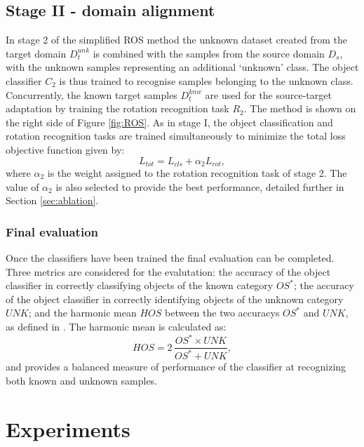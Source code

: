 \documentclass[10pt,twocolumn,letterpaper]{article}
\begin{document}
\subsection{Stage II - domain alignment}
\label{sec:stage2}

In stage 2 of the simplified ROS method the unknown dataset created from the target domain $D_t^{unk}$ is combined with the samples from the source domain $D_s$, with the unknown samples representing an additional `unknown' class. The object classifier $C_2$ is thus trained to recognise samples belonging to the unknown class. Concurrently, the known target samples  $D^{knw}_t$ are used for the source-target adaptation by training the rotation recognition task $R_2$. The method is shown on the right side of Figure \ref{fig:ROS}. As in stage I, the object classification and rotation recognition tasks are trained simultaneously to minimize the total loss objective function given by:
\begin{equation}
  L_{tot} = L_{cls} + \alpha_2 L_{rot} ,
  \label{eq:totalloss}
\end{equation}
where $\alpha_2$ is the weight assigned to the rotation recognition task of stage 2. The value of $\alpha_2$ is also selected to provide the best performance, detailed further in Section \ref{sec:ablation}. 


\subsubsection*{Final evaluation}

Once the classifiers have been trained the final evaluation can be completed. Three metrics are considered for the evalutation: the accuracy of the object classifier in correctly classifying objects of the known category $OS^*$; the accuracy of the object classifier in correctly identifying objects of the unknown category $UNK$; and the harmonic mean $HOS$ between the two accuracys $OS^*$ and $UNK$, as defined in \cite{Bucci2020}. The harmonic mean is calculated as:
\begin{equation}
 HOS = 2\, \frac{OS^* \times UNK}{OS^* + UNK} ,
 \label{eq:hos}
\end{equation}
and provides a balanced measure of performance of the classifier at recognizing both known and unknown samples.


\section{Experiments}
\label{sec:experiments}
\end{document}

